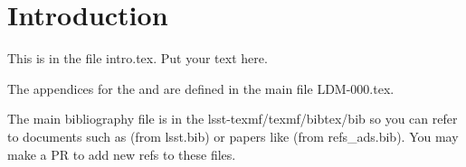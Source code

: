 \section{Introduction} \label{sec:intro}
This is in the file intro.tex. Put your text here.

The appendices for the  and  are defined in the main file LDM-000.tex.

The main bibliography file is in the lsst-texmf/texmf/bibtex/bib so you can refer to documents such as  (from lsst.bib)  or papers like \cite{2008arXiv0805.2366I} (from refs\_ads.bib). You may make a PR to add new refs to these files.
